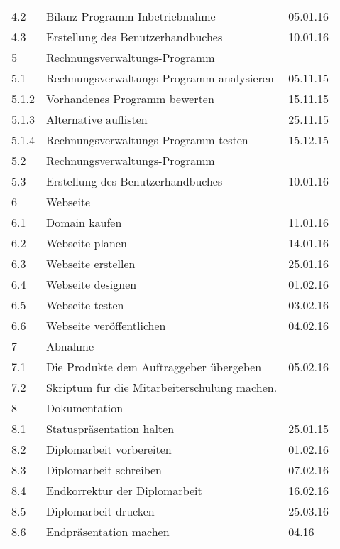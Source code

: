 \begin{table}[ht]
\begin{tabular}{l l l}
4.2 & Bilanz-Programm Inbetriebnahme & 05.01.16 \\
4.3 & Erstellung des Benutzerhandbuches & 10.01.16 \\
5 & Rechnungsverwaltungs-Programm \\
5.1 & Rechnungsverwaltungs-Programm analysieren & 05.11.15 \\
5.1.2 & Vorhandenes Programm bewerten & 15.11.15 \\
5.1.3 & Alternative auflisten & 25.11.15 \\
5.1.4 & Rechnungsverwaltungs-Programm testen & 15.12.15 \\
5.2 & Rechnungsverwaltungs-Programm  \\
5.3 & Erstellung des Benutzerhandbuches & 10.01.16 \\
6 & Webseite \\
6.1 & Domain kaufen & 11.01.16 \\
6.2 & Webseite planen & 14.01.16 \\
6.3 & Webseite erstellen & 25.01.16 \\
6.4 & Webseite designen & 01.02.16 \\
6.5 & Webseite testen & 03.02.16 \\
6.6 & Webseite ver\"offentlichen & 04.02.16 \\
7 & Abnahme \\
7.1 & Die Produkte dem Auftraggeber \"ubergeben & 05.02.16 \\
7.2 & Skriptum f\"ur die Mitarbeiterschulung machen. \\
8 & Dokumentation \\
8.1 & Statuspr\"asentation halten & 25.01.15 \\
8.2 & Diplomarbeit vorbereiten & 01.02.16 \\
8.3 & Diplomarbeit schreiben & 07.02.16 \\
8.4 & Endkorrektur der Diplomarbeit & 16.02.16 \\
8.5 & Diplomarbeit drucken & 25.03.16  \\
8.6 & Endpr\"asentation machen & 04.16 \\

\hline
\end{tabular}
\label{table:todoliste} 
\end{table}

